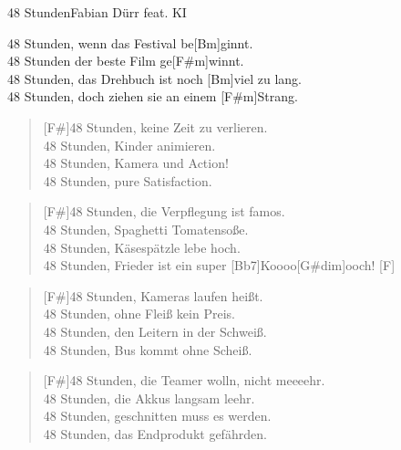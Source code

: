 \begin{song}{48 Stunden}{Fabian Dürr feat. KI}

    \begin{intro}  
        [F#m]48 Stunden, wenn das Festival be[Bm]ginnt. \\
        48 Stunden der beste Film ge[F#m]winnt. \\
        48 Stunden, das Drehbuch ist noch [Bm]viel zu lang. \\
        [C#7]48 Stunden, doch ziehen sie an einem [F#m]Strang.
    \end{intro}  

    \begin{verse}
        [F#]48 Stunden, keine Zeit zu verlieren. \\
        [C#]48 Stunden, Kinder animieren.\\
        [G#m]48 Stunden, Kamera und Action!\\
        [D]48 Stunden, pure Satisfaction.
    \end{verse}

    \begin{verse}
        [F#]48 Stunden, die Verpflegung ist famos.\\
        [C#]48 Stunden, Spaghetti Tomatensoße.\\
        [G#m]48 Stunden, Käsespätzle lebe hoch.\\
        [D]48 Stunden, Frieder ist ein super [Bb7]Koooo[G#dim]ooch! [F] \\
    \end{verse}

    \begin{verse}
        [F#]48 Stunden, Kameras laufen heißt.\\
        [C#]48 Stunden, ohne Fleiß kein Preis.\\
        [G#m]48 Stunden, den Leitern in der Schweiß.\\
        [D]48 Stunden, Bus kommt ohne Scheiß.\\
    \end{verse}

    \begin{verse}
        [F#]48 Stunden, die Teamer wolln, nicht meeeehr. \\
        [C#]48 Stunden, die Akkus langsam leehr.\\
        [G#m]48 Stunden, geschnitten muss es werden.\\
        [D]48 Stunden, das Endprodukt gefährden. \\
    \end{verse}


\end{song}
